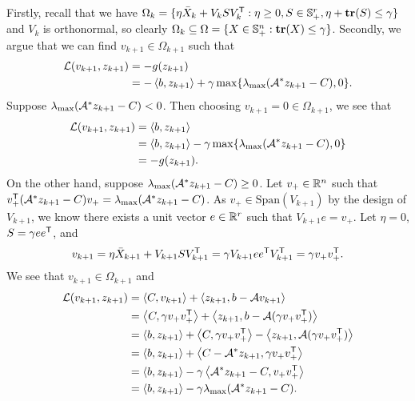 \documentclass[11pt]{article}
\begin{document}
    Firstly, recall that we have $\Omega_k = \{\eta \Bar{X}_k + V_k S V_k^{\mathsf{ T}} : \eta \geq 0, S \in \mathbb{S}_+^r, \eta + \mathop{\bf tr}(S) \leq \gamma\}$ and $V_k$ is orthonormal, so clearly $\Omega_k  \subseteq \Omega = \{X \in \mathbb{S}^n_+ : \mathop{\bf tr}(X) \leq \gamma\}$.    
    Secondly, we argue that we can find $v_{k+1} \in \Omega_{k+1}$ such that 
        \begin{align*}
            \mathcal{L}(v_{k+1},z_{k+1}) & = -g(z_{k+1})  \\
            & = -\left \langle b, z_{k+1} \right\rangle + \gamma \max\{\lambda_{\max}(\mathcal{A}^* z_{k+1}-C),0\}.
        \end{align*}
        Suppose $\lambda_{\max}(\mathcal{A}^* z_{k+1}-C) < 0$. Then choosing $v_{k+1} = 0 \in \Omega_{k+1}$, we see that
        \begin{equation*}
            \begin{aligned}
                \mathcal{L}(v_{k+1},z_{k+1})
                 &= \left \langle b, z_{k+1} \right\rangle  \\
                 &= \left \langle b, z_{k+1} \right\rangle - \gamma \max\{\lambda_{\max}(\mathcal{A}^* z_{k+1}-C),0\} \\
                 &= -g(z_{k+1}).
            \end{aligned}
        \end{equation*}
        On the other hand, suppose $\lambda_{\max}(\mathcal{A}^* z_{k+1}-C) \geq 0$. Let $v_+ \in \mathbb{R}^n$ such that $v_+^{\mathsf{ T}}(\mathcal{A}^* z_{k+1}-C)v_+ = \lambda_{\max}(\mathcal{A}^* z_{k+1}-C)$. As $v_+  \in \mathrm{Span}(V_{k+1})$ by the design of $V_{k+1}$, we know there exists a unit vector $e \in \mathbb{R}^r$ such that $V_{k+1}e = v_+$. Let $\eta = 0$, $S = \gamma e e^{\mathsf{ T}}$, and  $$v_{k+1}  = \eta \bar{X}_{k+1} + V_{k+1} S V_{k+1}^{\mathsf{ T}} = \gamma V_{k+1}  e e^{\mathsf{ T}} V_{k+1}^{\mathsf{ T}} = \gamma v_+ v_+^{\mathsf{ T}}.$$ We see that $  v_{k+1} \in \Omega_{k+1}$ and 
            \begin{equation*}
            \begin{aligned}
            \mathcal{L} (v_{k+1},z_{k+1})& = \left \langle C, v_{k+1} \right\rangle + \left \langle z_{k+1}, b-\mathcal{A} v_{k+1}  \right\rangle \\
                & = \left \langle C, \gamma v_+ v_+^{\mathsf{ T}} \right\rangle + \left \langle z_{k+1}, b-\mathcal{A} (\gamma v_+ v_+^{\mathsf{ T}}) \right\rangle \\
                & = \left \langle b, z_{k+1} \right\rangle + \left \langle C, \gamma v_+ v_+^{\mathsf{ T}} \right\rangle - \left \langle z_{k+1}, \mathcal{A}(\gamma v_+ v_+^{\mathsf{ T}}) \right\rangle \\
                & = \left \langle b, z_{k+1} \right\rangle + \left \langle C- \mathcal{A}^* z_{k+1}, \gamma v_+ v_+^{\mathsf{ T}} \right\rangle \\
                & = \left \langle b, z_{k+1} \right\rangle - \gamma \left \langle  \mathcal{A}^* z_{k+1} -C,  v_+ v_+^{\mathsf{ T}} \right\rangle \\
                & = \left \langle b, z_{k+1} \right\rangle - \gamma \lambda_{\max}(\mathcal{A}^* z_{k+1}-C).
            \end{aligned}
        \end{equation*}    
\end{document}
